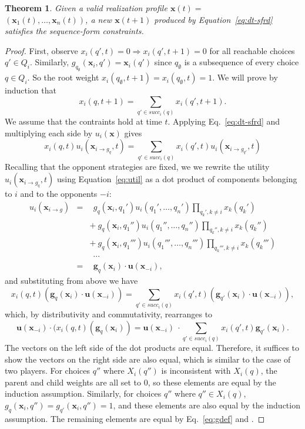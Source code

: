 \documentclass{aamas2014}
\newcommand{\bx}{\mathbf{x}}
\newcommand{\bg}{\mathbf{g}}
\newcommand{\bu}{\mathbf{u}}
\newtheorem{theorem}{Theorem}
\begin{document}
\begin{theorem}
Given a valid realization profile $\bx(t) = $\\ $(\bx_1(t), \ldots, \bx_n(t))$, a new $\bx(t+1)$ produced by
Equation~\ref{eq:dt-sfrd} satisfies the sequence-form constraints. 
\end{theorem}
\begin{proof}
First, observe $x_i(q',t) = 0 \Rightarrow x_i(q',t+1) = 0$ for all reachable choices $q' \in Q_i$. 
Similarly,  $g_{q_{\emptyset}}(\bx_i, q') = \bx_i(q')$ since $q_{\emptyset}$ is a subsequence of every choice 
$q \in Q_i$. So the root weight $x_i(q_{\emptyset}, t+1) = x_i(q_{\emptyset},t) = 1$.   
We will prove by induction that 
\[ x_i(q,t+1) = \sum_{q' \in succ_i(q)} x_i(q',t+1). \]
We assume that the contraints hold at time $t$. 
Applying Eq.~\ref{eq:dt-sfrd} and multiplying each side by $u_i(\bx)$ gives
\[
x_i(q,t) u_i(\bx_{i \rightarrow g_q}, t) = \sum_{q' \in succ_i(q)} x_i(q',t) u_i(\bx_{i \rightarrow g_{q'}},t) 
\]
Recalling that the opponent strategies are fixed, we 
we rewrite the utility $u_i(\bx_{i \rightarrow g_q}, t)$ using Equation~\ref{eq:util} as a dot product of 
components belonging to $i$ and to the opponents $-i$: 
\begin{eqnarray*}
u_i(\bx_{i \rightarrow g}) & = & ~~g_q(\bx_i, q_1') u_i(q_1', \ldots, q_n') \prod_{q_k', k \not= i} x_k(q_k') \\
                           &   & +~g_q(\bx_i, q_1'') u_i(q_1'', \ldots, q_n'') \prod_{q_k'', k \not= i} x_k(q_k'') \\
                           &   & +~g_q(\bx_i, q_1''') u_i(q_1''', \ldots, q_n''') \prod_{q_k''', k \not= i} x_k(q_k''') \\
                           &   & ~~\cdots \\
                           & = & ~~\bg_q(\bx_i) \cdot \bu(\bx_{-i}),
\end{eqnarray*}
and substituting from above we have 
\[x_i(q,t)(\bg_q(\bx_i) \cdot \bu(\bx_{-i})) = \sum_{q' \in succ_i(q)} x_i(q',t) (\bg_{q'}(\bx_i) \cdot \bu(\bx_{-i})), \]
which, by distributivity and commutativity, rearranges to
\[ \bu(\bx_{-i}) \cdot (x_i(q,t)(\bg_q(\bx_i)) = \bu(\bx_{-i})~\cdot\sum_{q' \in succ_i(q)} x_i(q',t) \bg_{q'}(\bx_i). \]
The vectors on the left side of the dot products are equal.
Therefore, it suffices to show the vectors on the right side are also equal, which is similar to the case of two players.   
For choices $q''$ where $X_i(q'')$ is inconsistent with $X_i(q)$, the parent and child weights are all set to $0$, so these 
elements are equal by the induction assumption. 
Similarly, for choices $q''$ where $q'' \in X_i(q)$, $g_q(\bx_i, q'') = g_{q'}(\bx_i, q'') = 1$, and these elements are also 
equal by the induction assumption. 
The remaining elements are equal by Eq.~\ref{eq:gdef} and \cite[Lemma 6]{Gatti13Efficient}. 
\end{proof}
\end{document}
